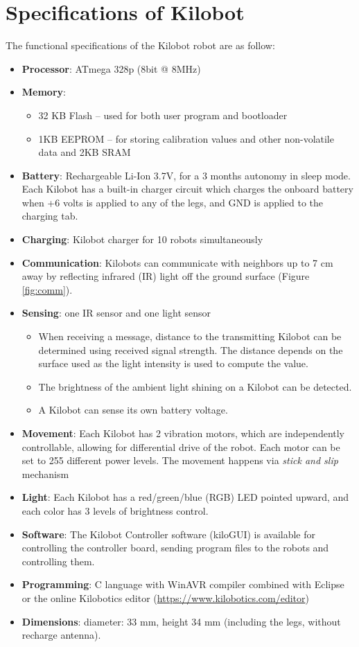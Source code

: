 \section{Specifications of Kilobot}
The functional specifications \cite{kilobotics_manual} of the Kilobot robot are as follow:
\begin{itemize}
\item \textbf{Processor}: ATmega 328p (8bit @ 8MHz)
\item \textbf{Memory}: 
\begin{itemize}
\item 32 KB Flash -- used for both user program and bootloader 
\item 1KB EEPROM -- for storing calibration values and other non-volatile data and 2KB SRAM
\end{itemize}
\item \textbf{Battery}: Rechargeable Li-Ion 3.7V, for a 3 months autonomy in
sleep mode. Each Kilobot has a built-in charger circuit which charges the onboard battery when +6 volts is applied to any of the legs, and GND is applied to the charging tab. 
\item \textbf{Charging}: Kilobot charger for 10 robots simultaneously
\item \textbf{Communication}: Kilobots can communicate with neighbors up to 7 cm away by reflecting infrared (IR) light off the ground surface (Figure \ref{fig:comm}). 
\item \textbf{Sensing}: one IR sensor and one light sensor 
\begin{itemize}
\item When receiving a message, distance to the transmitting Kilobot can be determined using received signal strength. The distance depends on the surface used as the light intensity is used to compute the value.
\item The brightness of the ambient light shining on a Kilobot can be detected.
\item A Kilobot can sense its own battery voltage.
\end{itemize}
\item \textbf{Movement}: Each Kilobot has 2 vibration motors, which are
independently controllable, allowing for differential drive
of the robot. Each motor can be set to 255 different power
levels. The movement happens via \emph{stick and slip} mechanism
\item \textbf{Light}: Each Kilobot has a red/green/blue (RGB) LED pointed
upward, and each color has 3 levels of brightness control. 
\item \textbf{Software}: The Kilobot Controller software (kiloGUI) is available for controlling the controller board, sending program files to
the robots and controlling them.
\item \textbf{Programming}: C language with WinAVR compiler combined with Eclipse or the online Kilobotics editor (\url{https://www.kilobotics.com/editor})
\item \textbf{Dimensions}: diameter: 33 mm, height 34 mm (including the legs,
without recharge antenna). 
\end{itemize}

